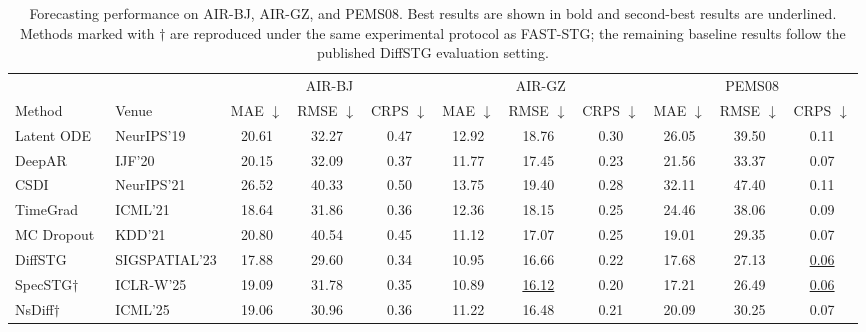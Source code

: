 \documentclass[sigconf, anonymous, review]{acmart}
\begin{document}
\begin{table}[t]
\centering
\caption{Forecasting performance on AIR-BJ, AIR-GZ, and PEMS08.
Best results are shown in
bold and second-best results are underlined. Methods marked with
$\dagger$ are reproduced under the same experimental protocol as
FAST-STG; the remaining baseline results follow the published
DiffSTG evaluation setting.}
\label{tab:probabilistic_results}
\small
\setlength{\tabcolsep}{3.8pt}
\renewcommand{\arraystretch}{1.08}
\begin{tabular}{@{}llccccccccc@{}}
\toprule
& &
\multicolumn{3}{c}{AIR-BJ}
& \multicolumn{3}{c}{AIR-GZ}
& \multicolumn{3}{c}{PEMS08} \\
\cmidrule(lr){3-5}
\cmidrule(lr){6-8}
\cmidrule(lr){9-11}

Method & Venue
& MAE $\downarrow$ & RMSE $\downarrow$ & CRPS $\downarrow$
& MAE $\downarrow$ & RMSE $\downarrow$ & CRPS $\downarrow$
& MAE $\downarrow$ & RMSE $\downarrow$ & CRPS $\downarrow$ \\
\midrule

Latent ODE~\cite{rubanova2019latent}
& NeurIPS'19
& 20.61 & 32.27 & 0.47
& 12.92 & 18.76 & 0.30
& 26.05 & 39.50 & 0.11 \\

DeepAR~\cite{salinas2020deepar}
& IJF'20
& 20.15 & 32.09 & 0.37
& 11.77 & 17.45 & 0.23
& 21.56 & 33.37 & 0.07 \\

CSDI~\cite{tashiro2021csdi}
& NeurIPS'21
& 26.52 & 40.33 & 0.50
& 13.75 & 19.40 & 0.28
& 32.11 & 47.40 & 0.11 \\

TimeGrad~\cite{rasul2021timegrad}
& ICML'21
& 18.64 & 31.86 & 0.36
& 12.36 & 18.15 & 0.25
& 24.46 & 38.06 & 0.09 \\

MC Dropout~\cite{wu2021uncertainty}
& KDD'21
& 20.80 & 40.54 & 0.45
& 11.12 & 17.07 & 0.25
& 19.01 & 29.35 & 0.07 \\

DiffSTG~\cite{wen2023diffstg}
& SIGSPATIAL'23
& 17.88 & 29.60 & 0.34
& 10.95 & 16.66 & 0.22
& 17.68 & 27.13 & \underline{0.06} \\

SpecSTG$\dagger$~\cite{lin2025specstg}
& ICLR-W'25
& 19.09 & 31.78 & 0.35
& 10.89 & \underline{16.12} & 0.20
& 17.21 & 26.49 & \underline{0.06} \\

NsDiff$\dagger$~\cite{ye2025nsdiff}
& ICML'25
& 19.06 & 30.96 & 0.36
& 11.22 & 16.48 & 0.21
& 20.09 & 30.25 & 0.07 \\


\end{tabular}
\end{table}
\end{document}
